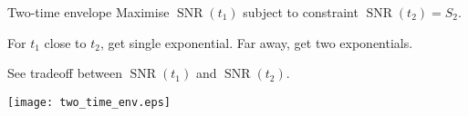 \documentclass{beamer}%
\DeclareMathOperator{\snr}{SNR}
\newcommand{\pr}{\mathbf{p}}
\newcommand{\eq}{\pr^\infty}
\newcommand{\F}{\boldsymbol{\Phi}}
\newcommand{\CS}{\mathcal{S}}
\newcommand{\comp}{^\mathrm{c}}
\begin{document}
%
%
%
%
%
%

\begin{frame}{Two-time envelope}
%
 Maximise $\snr(t_1)$ subject to constraint $\snr(t_2)=S_2$.

 \vp For $t_1$ close to $t_2$, get single exponential. Far away, get two exponentials.

 \vp See tradeoff between $\snr(t_1)$ and $\snr(t_2)$.

 \begin{center}
   \texttt{[image: two\_time\_env.eps]}
 \end{center}
%
\end{frame}
\end{document}
